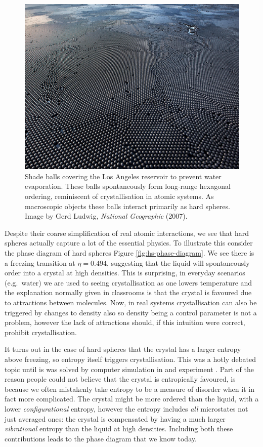 \documentclass[11pt,twoside]{report}
\begin{document}
\begin{figure}
  \includegraphics[width=\linewidth]{shade-balls}
  \caption[Shade balls in Los Angeles]{
    Shade balls covering the Los Angeles reservoir to prevent water evaporation.
    These balls spontaneously form long-range hexagonal ordering, reminiscent of crystallisation in atomic systems.
    As macroscopic objects these balls interact primarily as hard spheres.
    Image by Gerd Ludwig, \emph{National Geographic} (2007).}
  \label{fig:shade-balls}
\end{figure}

Despite their coarse simplification of real atomic interactions, we see that hard spheres actually capture a lot of the essential physics.
To illustrate this consider the phase diagram of hard spheres Figure \ref{fig:hs-phase-diagram}.
We see there is a freezing transition at $\eta = 0.494$, suggesting that the liquid will spontaneously order into a crystal at high densities.
This is surprising, in everyday scenarios (e.g.\ water) we are used to seeing crystallisation as one lowers temperature and the explanation normally given in classrooms is that the crystal is favoured due to attractions between molecules.
Now, in real systems crystallisation can also be triggered by changes to density also so density being a control parameter is not a problem, however the lack of attractions should, if this intuition were correct, prohibit crystallisation.

It turns out in the case of hard spheres that the crystal has a larger entropy above freezing, so entropy itself triggers crystallisation.
This was a hotly debated topic \cite{?,?,?} until is was solved by computer simulation in \cite{?,?,?} and experiment \cite{?,?,?}.
Part of the reason people could not believe that the crystal is entropically favoured, is because we often mistakenly take entropy to be a measure of disorder when it in fact more complicated.
The crystal might be more ordered than the liquid, with a lower \emph{configurational} entropy, however the entropy includes \emph{all} microstates not just averaged ones: the crystal is compensated by having a much larger \emph{vibrational} entropy than the liquid at high densities.
Including both these contributions leads to the phase diagram that we know today.
\end{document}

